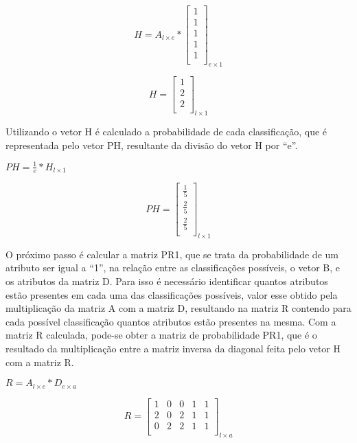 \begin{anexosenv}
$$H=A_{l \times e} * \left[
\begin{array}{c}
1 \\
1 \\
1 \\
1 \\
1 \\
\end{array}
\right]_{e \times 1}$$

$$H=\left[
\begin{array}{c}
1 \\
2 \\
2 \\
\end{array}
\right]_{l \times 1}$$

Utilizando o vetor H é calculado a probabilidade de cada classificação, que é representada
pelo vetor PH, resultante da divisão do vetor H por ``e''.

\begin{center}
$PH= \frac{1}{e} * H_{l \times 1}$
\end{center}

$$PH=\left[
\begin{array}{c}
\frac{1}{5} \\
\frac{2}{5} \\
\frac{2}{5} \\
\end{array}
\right]_{l \times 1}$$

O próximo passo é calcular a matriz PR1, que se trata da probabilidade de um
atributo ser igual a ``1'', na relação entre as classificações possíveis, o vetor B, e os
atributos da matriz D. Para isso é necessário identificar quantos atributos
estão presentes em cada uma das classificações possíveis, valor esse  obtido pela multiplicação da matriz A
com a matriz D, resultando na matriz R contendo para cada possível classificação
quantos atributos estão presentes na mesma. Com a matriz R calculada, pode-se
obter a matriz de probabilidade PR1, que é o resultado da multiplicação entre a
matriz inversa da diagonal feita pelo vetor H com a matriz R.

\begin{center}
$R = A_{l \times e} * D_{e \times a}$
\end{center}

$$R=\left[
\begin{array}{ccccc}
1 & 0 & 0 & 1 & 1 \\
2 & 0 & 2 & 1 & 1 \\
0 & 2 & 2 & 1 & 1 \\
\end{array}
\right]_{l \times a}$$


\end{anexosenv}

